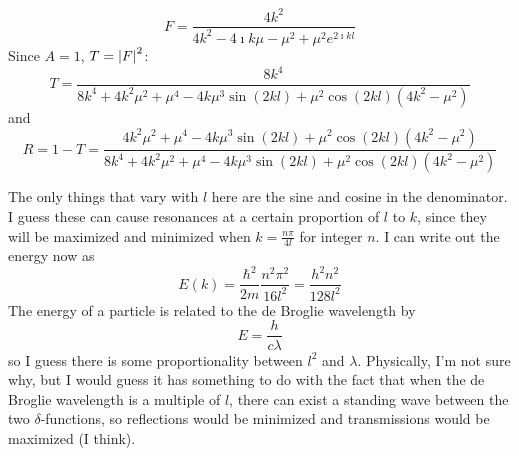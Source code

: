 \documentclass[a4paper,twoside]{article}
\begin{document}
\begin{itemize}
\begin{problem}
    \begin{equation}
        F = \frac{4 k^2}{4 k^2 - 4\imath k \mu - \mu^2 + \mu^2e^{2\imath k l}}
    \end{equation}
    Since $ A = 1 $, $ T = \abs{F}^2 $:
    \begin{equation}
        T = \frac{8 k^4}{8 k^4 + 4 k^2 \mu^2 + \mu^4 - 4 k \mu^3 \sin(2kl) + \mu^2 \cos(2kl)(4 k^2 - \mu^2)}
    \end{equation}
    and
    \begin{equation}
        R = 1-T = \frac{4 k^2 \mu^2 + \mu^4 - 4 k \mu^3 \sin(2kl) + \mu^2 \cos(2kl)(4 k^2 - \mu^2)}{8 k^4 + 4 k^2 \mu^2 + \mu^4 - 4 k \mu^3 \sin(2kl) + \mu^2 \cos(2kl)(4 k^2 - \mu^2)}
    \end{equation}

    The only things that vary with $ l $ here are the sine and cosine in the denominator. I guess these can cause resonances at a certain proportion of $ l $ to $ k $, since they will be maximized and minimized when $ k = \frac{n \pi}{4 l} $ for integer $ n $. I can write out the energy now as
    \begin{equation}
        E(k) = \frac{\hbar^2}{2m} \frac{n^2\pi^2}{16 l^2} = \frac{h^2 n^2}{128 l^2}
    \end{equation}
    The energy of a particle is related to the de Broglie wavelength by
    \begin{equation}
        E = \frac{h}{c\lambda}
    \end{equation}
    so I guess there is some proportionality between $ l^2 $ and $ \lambda $. Physically, I'm not sure why, but I would guess it has something to do with the fact that when the de Broglie wavelength is a multiple of $ l $, there can exist a standing wave between the two $\delta$-functions, so reflections would be minimized and transmissions would be maximized (I think).
\end{problem}
\end{itemize}
\end{document}
